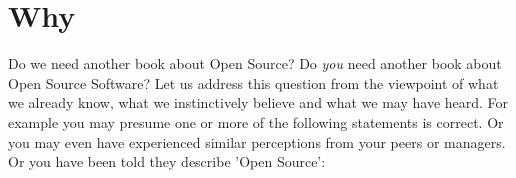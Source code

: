 %
%
%
%
%



\section{Why}

Do we need another book about Open Source? Do \emph{you} need another book about
Open Source Software? Let us address this question from the viewpoint of what we
already know, what we instinctively believe and what we may have heard. For
example you may presume one or more of the following statements is correct. Or
you may even have experienced similar perceptions from your peers or managers.
Or you have been told they describe 'Open Source':

